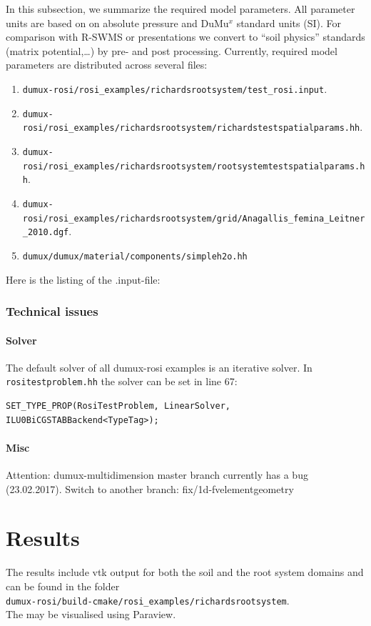 In this subsection, we summarize the required model parameters. All parameter units are based on on absolute pressure and DuMu$^x$ standard units (SI). For comparison with R-SWMS or presentations we convert to “soil physics” standards (matrix potential,…) by pre- and post processing. Currently, required model parameters are distributed across several files:
\begin{enumerate}
   \item \verb+dumux-rosi/rosi_examples/richardsrootsystem/test_rosi.input+.\\
	 \item \verb+dumux-rosi/rosi_examples/richardsrootsystem/richardstestspatialparams.hh+.\\
	 \item \verb+dumux-rosi/rosi_examples/richardsrootsystem/rootsystemtestspatialparams.hh+.\\	
	 \item \verb+dumux-rosi/rosi_examples/richardsrootsystem/grid/Anagallis_femina_Leitner_2010.dgf+.\\		
	 \item \verb+dumux/dumux/material/components/simpleh2o.hh+
\end{enumerate}


Here is the listing of the .input-file: 
	

\subsection*{Technical issues}
\subsubsection*{Solver}
The default solver of all dumux-rosi examples is an iterative solver. 
In \verb+rositestproblem.hh+ the solver can be set in line 67: 
\begin{lstlisting}
SET_TYPE_PROP(RosiTestProblem, LinearSolver, ILU0BiCGSTABBackend<TypeTag>);
\end{lstlisting}

\subsubsection*{Misc}
Attention: dumux-multidimension master branch currently has a bug (23.02.2017). Switch to another branch: fix/1d-fvelementgeometry

\chapter*{Results}
The results include vtk output for both the soil and the root system domains and can be found in the folder\\
\verb+dumux-rosi/build-cmake/rosi_examples/richardsrootsystem+.\\
The may be visualised using Paraview. 

